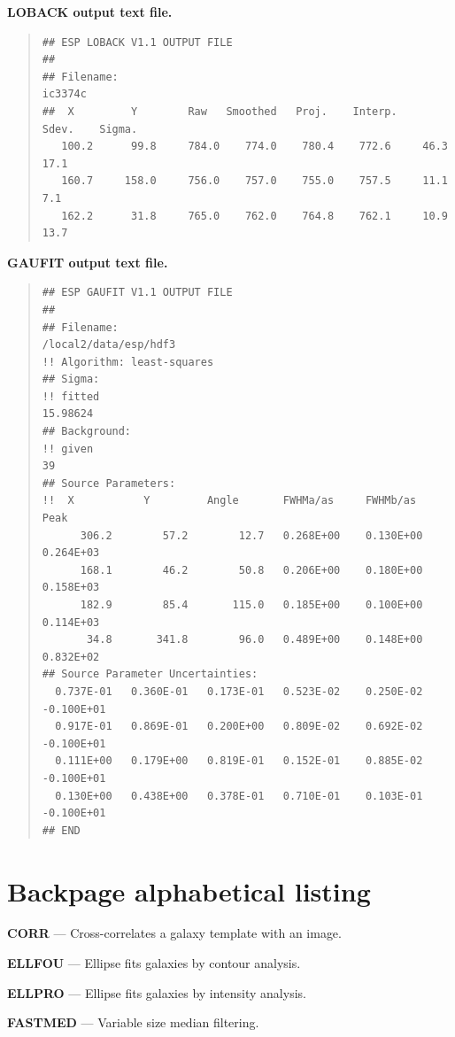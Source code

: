 \documentclass[twoside,11pt]{article}
\newenvironment{myquote}{\begin{quote}\begin{small}}{\end{small}\end{quote}}
\begin{document}
\bf{LOBACK} output text file.

\begin{myquote}
\begin{verbatim}
## ESP LOBACK V1.1 OUTPUT FILE
##
## Filename:
ic3374c
##  X         Y        Raw   Smoothed   Proj.    Interp.    Sdev.    Sigma.
   100.2      99.8     784.0    774.0    780.4    772.6     46.3     17.1
   160.7     158.0     756.0    757.0    755.0    757.5     11.1      7.1
   162.2      31.8     765.0    762.0    764.8    762.1     10.9     13.7
\end{verbatim}
\end{myquote}


\bf{GAUFIT} output text file.

\begin{myquote}
\begin{verbatim}
## ESP GAUFIT V1.1 OUTPUT FILE
##
## Filename:
/local2/data/esp/hdf3
!! Algorithm: least-squares
## Sigma:
!! fitted
15.98624
## Background:
!! given
39
## Source Parameters:
!!  X           Y         Angle       FWHMa/as     FWHMb/as      Peak
      306.2        57.2        12.7   0.268E+00    0.130E+00    0.264E+03
      168.1        46.2        50.8   0.206E+00    0.180E+00    0.158E+03
      182.9        85.4       115.0   0.185E+00    0.100E+00    0.114E+03
       34.8       341.8        96.0   0.489E+00    0.148E+00    0.832E+02
## Source Parameter Uncertainties:
  0.737E-01   0.360E-01   0.173E-01   0.523E-02    0.250E-02   -0.100E+01
  0.917E-01   0.869E-01   0.200E+00   0.809E-02    0.692E-02   -0.100E+01
  0.111E+00   0.179E+00   0.819E-01   0.152E-01    0.885E-02   -0.100E+01
  0.130E+00   0.438E+00   0.378E-01   0.710E-01    0.103E-01   -0.100E+01
## END
\end{verbatim}
\end{myquote}


\newpage
\section{Backpage alphabetical listing}
\label{app:backpage}

{\bf CORR}{ --- Cross-correlates a galaxy template with an image.}
\pageref{des:CORR}

{\bf ELLFOU}{ --- Ellipse fits galaxies by contour analysis.}
\pageref{des:ELLFOU}

{\bf ELLPRO}{ --- Ellipse fits galaxies by intensity analysis.}
\pageref{des:ELLPRO}

{\bf FASTMED}{ --- Variable size median filtering.}
\pageref{des:FASTMED}
\end{document}
